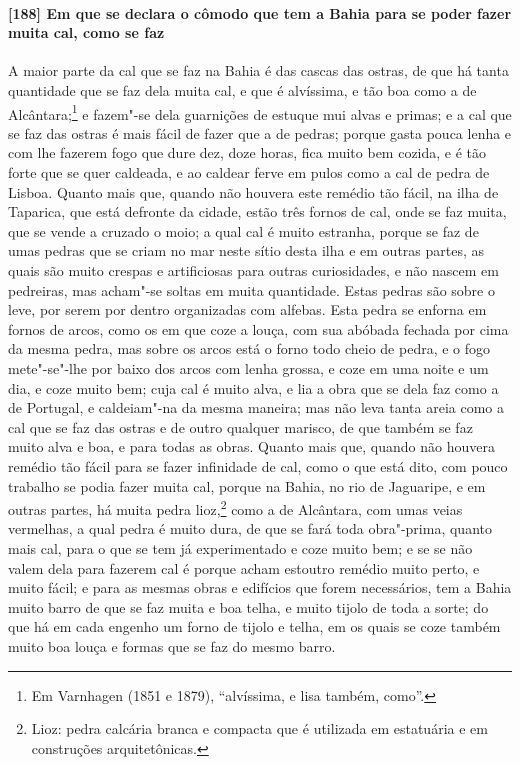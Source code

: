 \begin{linenumbers}
\paragraph{[188] Em que se declara o cômodo que tem a Bahia para se poder fazer muita cal,
como se faz}\quad
A maior parte da cal que se faz na Bahia é das cascas das ostras, de que há tanta
quantidade que se faz dela muita cal, e que é alvíssima, e tão boa como a de
Alcântara;\footnote{ Em Varnhagen (1851 e 1879), ``alvíssima, e lisa também, como''.} e
fazem"-se dela guarnições de estuque mui alvas e primas; e a cal que se faz das ostras é
mais fácil de fazer que a de pedras; porque gasta pouca lenha e com lhe fazerem fogo que
dure dez, doze horas, fica muito bem cozida, e é tão forte que se quer caldeada, e ao
caldear ferve em pulos como a cal de pedra de Lisboa. Quanto mais que, quando não houvera
este remédio tão fácil, na ilha de Taparica, que está defronte da cidade, estão três
fornos de cal, onde se faz muita, que se vende a cruzado o moio; a qual cal é muito
estranha, porque se faz de umas pedras que se criam no mar neste sítio desta ilha e em
outras partes, as quais são muito crespas e artificiosas para outras curiosidades, e não
nascem em pedreiras, mas acham"-se soltas em muita quantidade. Estas pedras são sobre o
leve, por serem por dentro organizadas com alfebas. Esta pedra se enforna em fornos de
arcos, como os em que coze a louça, com sua abóbada fechada por cima da mesma pedra, mas
sobre os arcos está o forno todo cheio de pedra, e o fogo mete"-se"-lhe por baixo dos arcos
com lenha grossa, e coze em uma noite e um dia, e coze muito bem; cuja cal é muito alva, e
lia a obra que se dela faz como a de Portugal, e caldeiam"-na da mesma maneira; mas não
leva tanta areia como a cal que se faz das ostras e de outro qualquer marisco, de que
também se faz muito alva e boa, e para todas as obras. Quanto mais que, quando não houvera
remédio tão fácil para se fazer infinidade de cal, como o que está dito, com pouco
trabalho se podia fazer muita cal, porque na Bahia, no rio de Jaguaripe, e em outras
partes, há muita pedra lioz,\footnote{ Lioz: pedra calcária branca e compacta que é
utilizada em estatuária e em construções arquitetônicas.} como a de Alcântara, com umas
veias vermelhas, a qual pedra é muito dura, de que se fará toda obra"-prima, quanto mais
cal, para o que se tem já experimentado e coze muito bem; e se se não valem dela para
fazerem cal é porque acham estoutro remédio muito perto, e muito fácil; e para as mesmas
obras e edifícios que forem necessários, tem a Bahia muito barro de que se faz muita e boa
telha, e muito tijolo de toda a sorte; do que há em cada engenho um forno de tijolo e
telha, em os quais se coze também muito boa louça e formas que se faz do mesmo barro.


\end{linenumbers}
